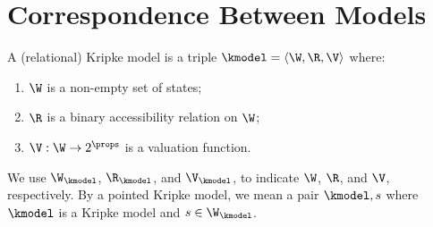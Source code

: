 \section{Correspondence Between Models}


\begin{definition}\label{def:kmodel}
  A (relational) Kripke model is a triple $\kmodel = \langle \W, {\R}, \V \rangle$ where:
  \begin{enumerate}
    \setlength{\itemsep}{0pt}
    \item $\W$ is a non-empty set of states;
    \item $\R$ is a binary accessibility relation on $\W$;
    \item $\V: \W \to 2^{\props}$ is a valuation function.
  \end{enumerate}
  We use $\W_{\kmodel}$, $\R_{\kmodel}$, and $\V_{\kmodel}$, to indicate $\W$, $\R$, and $\V$, respectively.
  By a pointed Kripke model, we mean a pair $\kmodel,s$ where $\kmodel$ is a Kripke model and $s \in \W_{\kmodel}$.
\end{definition}





